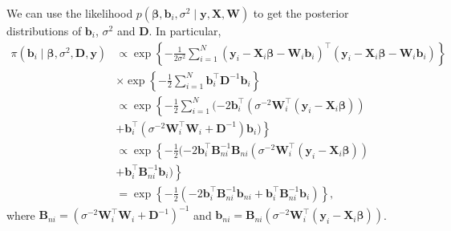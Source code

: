 We can use the likelihood $p(\bm{\beta},\bm{b}_i,\sigma^2\mid \bm{y}, \bm{X},\bm{W})$ to get the posterior distributions of $\bm{b}_i$, $\sigma^2$ and $\bm{D}$. In particular,
\begin{align*}
	\pi(\bm{b}_i\mid \bm{\beta},\sigma^2,\bm{D},\bm{y})&\propto \exp\left\{-\frac{1}{2\sigma^2}\sum_{i=1}^N(\bm{y}_i-\bm{X}_i\bm{\beta}-\bm{W}_i\bm{b}_i)^{\top}(\bm{y}_i-\bm{X}_i\bm{\beta}-\bm{W}_i\bm{b}_i)\right\}\\
	&\times \exp\left\{-\frac{1}{2}\sum_{i=1}^N \bm{b}_i^{\top}\bm{D}^{-1}\bm{b}_i\right\}\\
	&\propto\exp\left\{-\frac{1}{2}\sum_{i=1}^N(-2\bm{b}_i^{\top}(\sigma^{-2}\bm{W}_i^{\top}(\bm{y}_i-\bm{X}_i\bm{\beta}))\right.\\
	&\left.+ \bm{b}_i^{\top}(\sigma^{-2}\bm{W}_i^{\top}\bm{W}_i+\bm{D}^{-1})\bm{b}_i)\right\}\\
	&\propto\exp\left\{-\frac{1}{2}(-2\bm{b}_i^{\top}\bm{B}_{ni}^{-1}\bm{B}_{ni}(\sigma^{-2}\bm{W}_i^{\top}(\bm{y}_i-\bm{X}_i\bm{\beta}))\right.\\
	&\left.+ \bm{b}_i^{\top}\bm{B}_{ni}^{-1}\bm{b}_i)\right\}\\
	&=\exp\left\{-\frac{1}{2}(-2\bm{b}_i^{\top}\bm{B}_{ni}^{-1}\bm{b}_{ni}+ \bm{b}_i^{\top}\bm{B}_{ni}^{-1}\bm{b}_i)\right\}, 
\end{align*}
where $\bm{B}_{ni}=(\sigma^{-2}\bm{W}_i^{\top}\bm{W}_i+\bm{D}^{-1})^{-1}$ and $\bm{b}_{ni}=\bm{B}_{ni}(\sigma^{-2}\bm{W}_i^{\top}(\bm{y}_i-\bm{X}_i\bm{\beta}))$.

